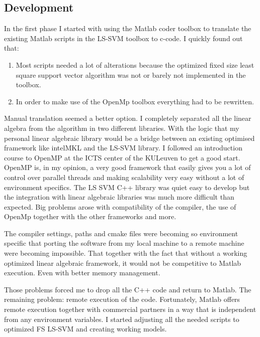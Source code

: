 \subsection{Development}
In the first phase I started with using the Matlab coder toolbox to translate the existing Matlab scripts in the LS-SVM toolbox to c-code.
I quickly found out that:
\begin{enumerate}
	\item Most scripts needed a lot of alterations because the optimized fixed size least square support vector algorithm was not or barely not implemented in the toolbox.
	\item In order to make use of the OpenMp toolbox everything had to be rewritten.
\end{enumerate} 
Manual translation seemed a better option.
I completely separated all the linear algebra from the algorithm in two different libraries.
With the logic that my personal linear algebraic library would be a bridge between an existing optimised framework like intelMKL and the LS-SVM library.
I followed an introduction course to OpenMP at the ICTS center of the KULeuven to get a good start.
OpenMP is, in my opinion, a very good framework that easily gives you a lot of control over parallel threads and making scalability very easy without a lot of environment specifics.
The LS SVM C++ library was quiet easy to develop but the integration with linear algebraic libraries was much more difficult than expected.
Big problems arose with compatibility of the compiler, the use of OpenMp together with the other frameworks and more.
\par 
The compiler settings, paths and cmake files were becoming so environment specific that porting the software from my local machine to a remote machine were becoming impossible.
That together with the fact that without a working optimized linear algebraic framework, it would not be competitive to Matlab execution.
Even with better memory management.
\par 
Those problems forced me to drop all the C++ code and return to Matlab.
The remaining problem: remote execution of the code.
Fortunately, Matlab offers remote execution together with commercial partners in a way that is independent from any environment variables. 
I started adjusting all the needed scripts to optimized FS LS-SVM and creating working models.
